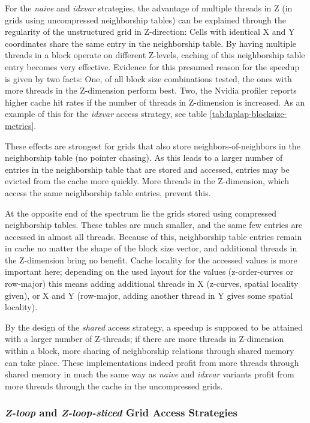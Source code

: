 For the \emph{naive} and \emph{idxvar} strategies, the advantage of multiple threads in Z (in grids using uncompressed neighborship tables) can be explained through the regularity of the unstructured grid in Z-direction: Cells with identical X and Y coordinates share the same entry in the neighborship table. By having multiple threads in a block operate on different Z-levels, caching of this neighborship table entry becomes very effective. Evidence for this presumed reason for the speedup is given by two facts: One, of all block size combinations tested, the ones with more threads in the Z-dimension perform best. Two, the Nvidia profiler reports higher cache hit rates if the number of threads in Z-dimension is increased. As an example of this for the \emph{idxvar} access strategy, see table \ref{tab:laplap-blocksize-metrics}.

These effects are strongest for grids that also store neighbors-of-neighbors in the neighborship table (no pointer chasing). As this leads to a larger number of entries in the neighborship table that are stored and accessed, entries may be evicted from the cache more quickly. More threads in the Z-dimension, which access the same neighborship table entries, prevent this.

At the opposite end of the spectrum lie the grids stored using compressed neighborship tables. These tables are much smaller, and the same few entries are accessed in almost all threads. Because of this, neighborship table entries remain in cache no matter the shape of the block size vector, and additional threads in the Z-dimension bring no benefit. Cache locality for the accessed values is more important here; depending on the used layout for the values (z-order-curves or row-major) this means adding additional threads in X (z-curves, spatial locality given), or X and Y (row-major, adding another thread in Y gives some spatial locality).

By the design of the \emph{shared} access strategy, a speedup is supposed to be attained with a larger number of Z-threads; if there are more threads in Z-dimension within a block, more sharing of neighborship relations through shared memory can take place. These implementations indeed profit from more threads through shared memory in much the same way as \emph{naive} and \emph{idxvar} variants profit from more threads through the cache in the uncompressed grids.

\subsubsection{\emph{Z-loop} and \emph{Z-loop-sliced} Grid Access Strategies}

